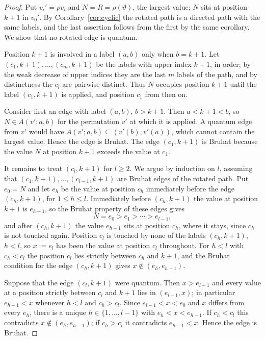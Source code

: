 \documentclass[11pt]{article}
\begin{document}
\begin{proof}
Put $v_i'=\rho v_i$ and $N=R=\rho(\vartheta)$, the largest value;
$N$ sits at position $k+1$ in $v_0'$. By Corollary~\ref{cor:cyclic}
the rotated path is a directed path with the same labels, and the
last assertion follows from the first by the same corollary. We show
that no rotated edge is quantum.

Position $k+1$ is involved in a label $(a,b)$ only when $b=k+1$.
Let $(c_1,k+1),\ldots,(c_m,k+1)$ be the labels with upper index
$k+1$, in order; by the weak decrease of upper indices they are the
last $m$ labels of the path, and by distinctness the $c_l$ are
pairwise distinct. Thus $N$ occupies position $k+1$ until the label
$(c_1,k+1)$ is applied, and position $c_1$ from then on.

Consider first an edge with label $(a,b)$, $b>k+1$. Then
$a<k+1<b$, so $N\in A(v';a,b)$ for the permutation $v'$ at which it
is applied. A quantum edge from $v'$ would have
$A(v';a,b)\subseteq(v'(b),v'(a))$, which cannot contain the largest
value. Hence the edge is Bruhat. The edge $(c_1,k+1)$ is Bruhat
because the value $N$ at position $k+1$ exceeds the value at $c_1$.

It remains to treat $(c_l,k+1)$ for $l\geq2$. We argue by induction
on $l$, assuming that $(c_1,k+1),\ldots,(c_{l-1},k+1)$ are Bruhat
edges of the rotated path. Put $e_0=N$ and let $e_h$ be the value at
position $c_h$ immediately before the edge $(c_h,k+1)$, for
$1\leq h\leq l$. Immediately before $(c_h,k+1)$ the value at position
$k+1$ is $e_{h-1}$, so the Bruhat property of these edges gives
\[
 N=e_0>e_1>\cdots>e_{l-1},
\]
and after $(c_h,k+1)$ the value $e_{h-1}$ sits at position $c_h$,
where it stays, since $c_h$ is not touched again. Position $c_l$ is
touched by none of the labels $(c_h,k+1)$, $h<l$, so $x:=e_l$ has been
the value at position $c_l$ throughout. For $h<l$ with $c_h<c_l$ the
position $c_l$ lies strictly between $c_h$ and $k+1$, and the Bruhat
condition for the edge $(c_h,k+1)$ gives $x\notin(e_h,e_{h-1})$.

Suppose that the edge $(c_l,k+1)$ were quantum. Then $x>e_{l-1}$ and
every value at a position strictly between $c_l$ and $k+1$ lies in
$(e_{l-1},x)$; in particular $e_{h-1}<x$ whenever $h<l$ and $c_h>c_l$.
Since $e_{l-1}<x<e_0$ and $x$ differs from every $e_h$, there is a
unique $h\in\{1,\ldots,l-1\}$ with $e_h<x<e_{h-1}$. If $c_h<c_l$ this
contradicts $x\notin(e_h,e_{h-1})$; if $c_h>c_l$ it contradicts
$e_{h-1}<x$. Hence the edge is Bruhat.
\end{proof}
\end{document}
